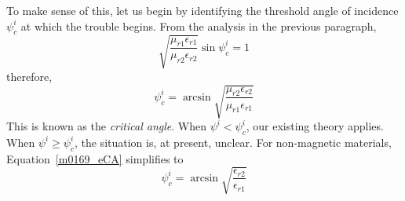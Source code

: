 To make sense of this, let us begin by identifying the threshold angle of incidence $\psi^i_c$ at which the trouble begins.
From the analysis in the previous paragraph,
%
\begin{equation}
\sqrt{\frac{\mu_{r1}\epsilon_{r1}}{\mu_{r2}\epsilon_{r2}}} \sin\psi^i_c = 1
\end{equation}
%
therefore,
%
\begin{equation}
\boxed{
\psi^i_c = \arcsin\sqrt{\frac{\mu_{r2}\epsilon_{r2}}{\mu_{r1}\epsilon_{r1}}}
}
\label{m0169_eCA}
\end{equation}
%
This is known as the \emph{critical angle}.
When $\psi^i<\psi^i_c$, our existing theory applies.
When $\psi^i\ge\psi^i_c$, the situation is, at present, unclear.
For non-magnetic materials, Equation~\ref{m0169_eCA} simplifies to
%
\begin{equation}
\psi^i_c = \arcsin\sqrt{\frac{\epsilon_{r2}}{\epsilon_{r1}}}
\label{m0169_eCAnm}
\end{equation}

